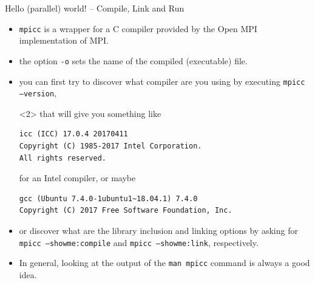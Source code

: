 \documentclass{beamer}
\begin{document}
\begin{frame}[fragile]{Hello (parallel) world! -- Compile, Link and Run}
\begin{itemize}
	\item \texttt{mpicc} is a wrapper for a C compiler provided by the Open MPI implementation of MPI.
	\item the option \texttt{-o} sets the name of the compiled (executable) file.
\end{itemize}
\begin{itemize}
	\item<2-> you can first try to discover what compiler are you using by executing \texttt{mpicc --version}, \begin{onlyenv}
that will give you something like
\begin{verbatim}
icc (ICC) 17.0.4 20170411
Copyright (C) 1985-2017 Intel Corporation.  
All rights reserved.
\end{verbatim} 
for an Intel compiler, or maybe
\begin{verbatim}
gcc (Ubuntu 7.4.0-1ubuntu1~18.04.1) 7.4.0
Copyright (C) 2017 Free Software Foundation, Inc.
\end{verbatim}		
	\end{onlyenv}
\item<3-> or discover what are the library inclusion and linking options by asking for \texttt{mpicc --showme:compile} and \texttt{mpicc --showme:link}, respectively.
\item<4-> In general, looking at the output of the \texttt{man mpicc} command is always a good idea.
\end{itemize} 
\end{frame}
\end{document}
